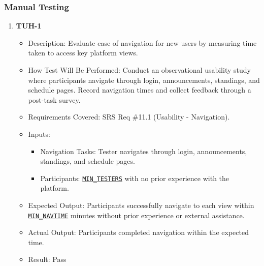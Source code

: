 \documentclass[12pt, titlepage]{article}
\begin{document}
\subsubsection{Manual Testing}
\begin{enumerate}
\item \textbf{TUH-1}  
      \begin{itemize}
          \item Description: Evaluate ease of navigation for new users by measuring time taken to access key platform views.
          \item How Test Will Be Performed: Conduct an observational usability study where participants navigate through login, announcements, standings, and schedule pages. Record navigation times and collect feedback through a post-task survey.
          \item Requirements Covered: SRS Req \#11.1 (Usability - Navigation).
          \item Inputs:  
              \begin{itemize}
                  \item Navigation Tasks: Tester navigates through login, announcements, standings, and schedule pages.
                  \item Participants: \hyperref[MIN_TESTERS]{\texttt{MIN\_TESTERS}} with no prior experience with the platform.
              \end{itemize}
          \item Expected Output: Participants successfully navigate to each view within \hyperref[MIN_NAVTIME]{\texttt{MIN\_NAVTIME}} minutes without prior experience or external assistance.
          \item Actual Output: Participants completed navigation within the expected time.
          \item Result: Pass
      \end{itemize}


\end{enumerate}
\end{document}
